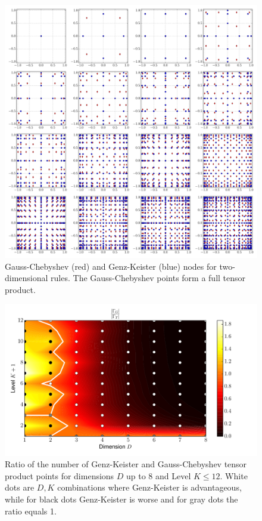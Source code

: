 \documentclass[a4paper,10pt]{article}
\begin{document}
\begin{figure}[h]
  \centering
  \includegraphics[width=\linewidth]{./img/gk_chebyshevt_nodes_2d.pdf}
  \caption{Gauss-Chebyshev (red) and Genz-Keister (blue) nodes for
  two-dimensional rules. The Gauss-Chebyshev points form a full tensor
  product.}
  \label{fig:gk_chebyshevt_nodes_2d}
\end{figure}

\begin{figure}[h]
  \centering
  \includegraphics[width=0.8\linewidth]{./img/gk_chebyshevt_ratio.pdf}
  \caption{Ratio of the number of Genz-Keister and Gauss-Chebyshev tensor product
  points for dimensions $D$ up to 8 and Level $K \leq 12$. White dots are $D,K$
  combinations where Genz-Keister is advantageous, while for black dots
  Genz-Keister is worse and for gray dots the ratio equals 1.}
  \label{fig:gk_chebyshevt_ratio}
\end{figure}
\end{document}
